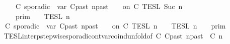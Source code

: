 \begin{isabellebody}
\ \ \ \ \ \ \ \ \ {\isasymunion}\ {\isasymlbrakk}\ C\ sporadic{\isasymsharp}\ {\isasymlparr}\ {\isasymtau}\isactrlsub v\isactrlsub a\isactrlsub r\ {\isacharparenleft}C\isactrlsub p\isactrlsub a\isactrlsub s\isactrlsub t{\isacharcomma}\ n\isactrlsub p\isactrlsub a\isactrlsub s\isactrlsub t{\isacharparenright}\ {\isasymoplus}\ {\isasymdelta}{\isasymtau}\ {\isasymrparr}\ on\ C\ {\isasymrbrakk}\isactrlsub T\isactrlsub E\isactrlsub S\isactrlsub L\isactrlbsup {\isasymge}\ Suc\ n\isactrlesup {\isacharparenright}\isanewline
\ \ \ \ \ \ \ \ {\isasyminter}\ {\isacharparenleft}{\isasymlbrakk}{\isasymlbrakk}\ {\isasymGamma}\ {\isasymrbrakk}{\isasymrbrakk}\isactrlsub p\isactrlsub r\isactrlsub i\isactrlsub m\ {\isasyminter}\ {\isasymlbrakk}{\isasymlbrakk}\ {\isasymPsi}\ {\isasymrbrakk}{\isasymrbrakk}\isactrlsub T\isactrlsub E\isactrlsub S\isactrlsub L\isactrlbsup {\isasymge}\ n\isactrlesup {\isacharparenright}\isanewline
\ \ \ \ \ \ {\isacharequal}\ {\isasymlbrakk}\ C\ sporadic{\isasymsharp}\ {\isasymlparr}\ {\isasymtau}\isactrlsub v\isactrlsub a\isactrlsub r\ {\isacharparenleft}C\isactrlsub p\isactrlsub a\isactrlsub s\isactrlsub t{\isacharcomma}\ n\isactrlsub p\isactrlsub a\isactrlsub s\isactrlsub t{\isacharparenright}\ {\isasymoplus}\ {\isasymdelta}{\isasymtau}\ {\isasymrparr}\ on\ C\ {\isasymrbrakk}\isactrlsub T\isactrlsub E\isactrlsub S\isactrlsub L\isactrlbsup {\isasymge}\ n\isactrlesup \ {\isasyminter}\ {\isacharparenleft}{\isasymlbrakk}{\isasymlbrakk}\ {\isasymPsi}\ {\isasymrbrakk}{\isasymrbrakk}\isactrlsub T\isactrlsub E\isactrlsub S\isactrlsub L\isactrlbsup {\isasymge}\ n\isactrlesup \ {\isasyminter}\ {\isasymlbrakk}{\isasymlbrakk}\ {\isasymGamma}\ {\isasymrbrakk}{\isasymrbrakk}\isactrlsub p\isactrlsub r\isactrlsub i\isactrlsub m{\isacharparenright}{\isacartoucheclose}\isanewline
\ \ \ \ \ \ \isamarkupfalse%
\ TESL{\isacharunderscore}interp{\isacharunderscore}stepwise{\isacharunderscore}sporadicon{\isacharunderscore}tvar{\isacharunderscore}coind{\isacharunderscore}unfold{\isacharbrackleft}of\ {\isacartoucheopen}C\ {\isacartoucheopen}C\isactrlsub p\isactrlsub a\isactrlsub s\isactrlsub t{\isacartoucheclose}\ {\isacartoucheopen}n\isactrlsub p\isactrlsub a\isactrlsub s\isactrlsub t{\isacartoucheclose}\ {\isacartoucheopen}{\isasymdelta}{\isasymtau}{\isacartoucheclose}\ {\isacartoucheopen}C\ {\isacartoucheopen}n{\isacartoucheclose}{\isacharbrackright}\isanewline

\end{isabellebody}
